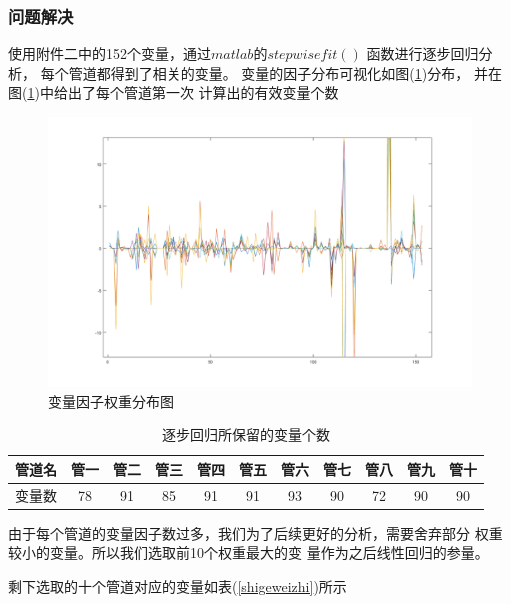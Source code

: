        \subsubsection{问题解决}
            使用附件二中的152个变量，通过$matlab$的$stepwisefit()$
            函数进行逐步回归分析，
            每个管道都得到了相关的变量。
            变量的因子分布可视化如图(\ref{quanzhong})分布，
            并在图(\ref{bianlianggeshu})中给出了每个管道第一次
            计算出的有效变量个数
            \begin{figure}
                \includegraphics[width=\textwidth]{figures/变量因子分布.png}
                \caption{变量因子权重分布图}
                \label{quanzhong}
            \end{figure}
            \begin{table}
                \centering
                \begin{tabular}{|c|c|c|c|c|c|c|c|c|c|c|}
                    \hline
                    管道名&管一&管二&管三&管四&管五&管六&管七&管八&管九&管十\\
                    \hline
                    变量数&78&91&85&91&91&93&90&72&90&90\\
                    \hline
                \end{tabular}
                \caption{逐步回归所保留的变量个数}
                \label{bianlianggeshu}
            \end{table}
            由于每个管道的变量因子数过多，我们为了后续更好的分析，需要舍弃部分
            权重较小的变量。所以我们选取前10个权重最大的变
            量作为之后线性回归的参量。\par
            剩下选取的十个管道对应的变量如表(\ref{shigeweizhi})所示
